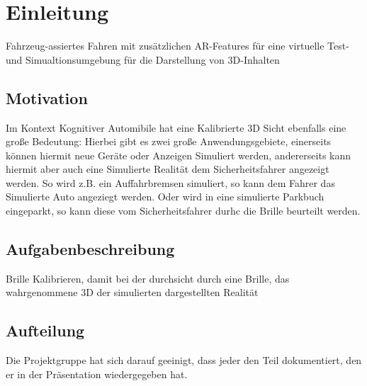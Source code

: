 \section{Einleitung}
Fahrzeug-assiertes Fahren mit zusätzlichen AR-Features für eine virtuelle Test- und Simualtionsumgebung für die Darstellung von 3D-Inhalten 

\subsection{Motivation}
Im Kontext Kognitiver Automibile hat eine Kalibrierte 3D Sicht ebenfalls eine große Bedeutung: Hierbei gibt es zwei große Anwendungsgebiete, einerseits können hiermit neue Geräte oder Anzeigen Simuliert werden, andererseits kann hiermit aber auch eine Simulierte Realität dem Sicherheitsfahrer angezeigt werden. So wird z.B. ein Auffahrbremsen simuliert, so kann dem Fahrer das Simulierte Auto angeziegt werden. Oder wird in eine simulierte Parkbuch eingeparkt, so kann diese vom Sicherheitsfahrer durhc die Brille beurteilt werden.

\subsection{Aufgabenbeschreibung}
Brille Kalibrieren, damit bei der durchsicht durch eine Brille, das wahrgenommene 3D der simulierten dargestellten Realität

\subsection{Aufteilung}
Die Projektgruppe hat sich darauf geeinigt, dass jeder den Teil dokumentiert, den er in der Präsentation wiedergegeben hat.